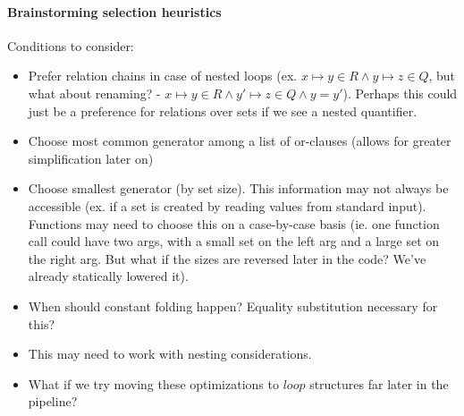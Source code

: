 \documentclass{article}
\begin{document}
\paragraph{Brainstorming selection heuristics}
Conditions to consider:
\begin{itemize}
  \item Prefer relation chains in case of nested loops (ex. $x \mapsto y \in R \land y \mapsto z \in Q$, but what about renaming? - $x \mapsto y \in R \land y' \mapsto z \in Q \land y = y'$). Perhaps this could just be a preference for relations over sets if we see a nested quantifier.
  \item Choose most common generator among a list of or-clauses (allows for greater simplification later on)
  \item Choose smallest generator (by set size). This information may not always be accessible (ex. if a set is created by reading values from standard input). Functions may need to choose this on a case-by-case basis (ie. one function call could have two args, with a small set on the left arg and a large set on the right arg. But what if the sizes are reversed later in the code? We've already statically lowered it).
  \item When should constant folding happen? Equality substitution necessary for this?
  \item This may need to work with nesting considerations.
  \item What if we try moving these optimizations to $loop$ structures far later in the pipeline?
\end{itemize}
\end{document}
